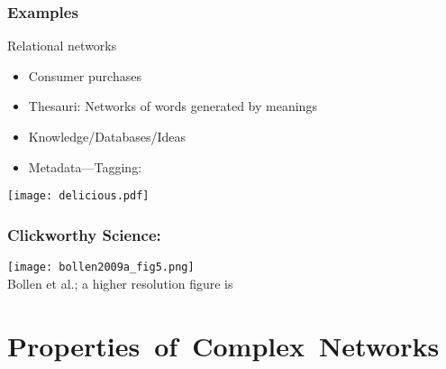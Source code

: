 \begin{frame}
  \frametitle{Examples}

  \begin{block}{Relational networks}
    \begin{itemize}
    \item<1-> 
      Consumer purchases \\
    \item<3-> 
      Thesauri: Networks of words generated by meanings
    \item<4-> 
      Knowledge/Databases/Ideas
    \item<5-> 
      Metadata---Tagging:
    \end{itemize}
  \end{block}
  \begin{overprint}
    \texttt{[image: delicious.pdf]}
  \end{overprint}

\end{frame}


\begin{frame}
  \frametitle{Clickworthy Science:}

  \begin{center}
    \texttt{[image: bollen2009a\_fig5.png]}\\
    Bollen et al.\cite{bollen2009a};
    a higher resolution figure is
  \end{center}

\end{frame}




\section{Properties\ of\ Complex\ Networks}

